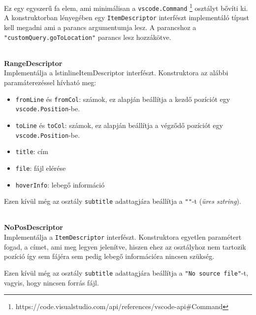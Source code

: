 Ez egy egyszerű fa elem, ami minimálisan a \lstinline{vscode.Command} \footnote{https://code.visualstudio.com/api/references/vscode-api#Command} osztályt bővíti ki. 
A konstruktorban lényegében egy \lstinline{ItemDescriptor} interfészt implementáló típust kell megadni ami a parancs argumentumja lesz. A parancshoz a \lstinline{"customQuery.goToLocation"} parancs lesz hozzákötve.


\\
\vspace{14pt}
\textbf{RangeDescriptor}
\\

Implementálja a lstinline{ItemDescriptor} interfészt. Konstruktora az alábbi paramáterezéssel hívható meg: 

\begin{itemize}
    \item \lstinline{fromLine} és \lstinline{fromCol}: számok, ez alapján beállítja a kezdő pozíciót egy \lstinline{vscode.Position}-be.
    
    \item \lstinline{toLine} és \lstinline{toCol}: számok, ez alapján beállítja a végződő pozíciót egy \lstinline{vscode.Position}-be.
    
    \item \lstinline{title}: cím
    
    \item \lstinline{file}: fájl elérése
    
    \item \lstinline{hoverInfo}: lebegő információ

\end{itemize}

\noindent Ezen kívül még az osztály \lstinline{subtitle} adattagjára beállítja a \lstinline{""}-t (\textit{üres sztring}).


\\
\vspace{14pt}
\textbf{NoPosDescriptor}
\\

Implementálja a \lstinline{ItemDescriptor} interfészt. Konstruktora egyetlen paramétert fogad, a címet, ami meg legyen jelenítve, hiszen ehez az osztályhoz nem tartozik pozíció így sem fájéra sem pedig lebegő információra nincsen szükség.

\noindent Ezen kívül még az osztály \lstinline{subtitle} adattagjára beállítja a \lstinline{"No source file"}-t, vagyis, hogy nincsen forrás fájl.






